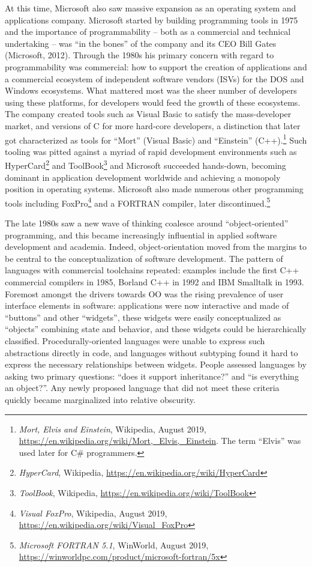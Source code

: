 \documentclass[acmsmall,review]{acmart}\settopmatter{printfolios=true,printccs=false,printacmref=false}
\begin{document}
At this time, Microsoft also saw massive expansion as an operating system and applications company.  Microsoft started by building programming tools in 1975 and the importance of programmability – both as a commercial and technical undertaking – was “in the bones” of the company and its CEO Bill Gates (Microsoft, 2012).  Through the 1980s his primary concern with regard to programmability was commercial: how to support the creation of applications and a commercial ecosystem of independent software vendors (ISVs) for the DOS and Windows ecosystems.  What mattered most was the sheer number of developers using these platforms, for developers would feed the growth of these ecosystems.  The company created tools such as Visual Basic to satisfy the mass-developer market, and versions of C for more hard-core developers, a distinction that later got characterized as tools for “Mort” (Visual Basic) and “Einstein” (C++).\footnote{ \textit{Mort, Elvis and Einstein}, Wikipedia, August 2019, \url{https://en.wikipedia.org/wiki/Mort,_Elvis,_Einstein}.  The term “Elvis” was used later for C\# programmers.}  Such tooling was pitted against a myriad of rapid development environments such as HyperCard\footnote{\textit{HyperCard}, Wikipedia, \url{https://en.wikipedia.org/wiki/HyperCard}}  and ToolBook\footnote{\textit{ToolBook}, Wikipedia, \url{https://en.wikipedia.org/wiki/ToolBook}} and Microsoft succeeded hands-down, becoming dominant in application development worldwide and achieving a monopoly position in operating systems.  Microsoft also made numerous other programming tools including FoxPro\footnote{ \textit{Visual FoxPro}, Wikipedia, August 2019, \url{https://en.wikipedia.org/wiki/Visual_FoxPro}} and a FORTRAN compiler, later discontinued.\footnote{ \textit{Microsoft FORTRAN 5.1}, WinWorld, August 2019, \url{https://winworldpc.com/product/microsoft-fortran/5x}}

The late 1980s saw a new wave of thinking coalesce around “object-oriented” programming, and this became increasingly influential in applied software development and academia.  Indeed, object-orientation moved from the margins to be central to the conceptualization of software development.  The pattern of languages with commercial toolchains repeated: examples include the first C++ commercial compilers in 1985, Borland C++ in 1992 and IBM Smalltalk in 1993.   Foremost amongst the drivers towards OO was the rising prevalence of user interface elements in software: applications were now interactive and made of “buttons” and other “widgets”, these widgets were easily conceptualized as “objects” combining state and behavior, and these widgets could be hierarchically classified. Procedurally-oriented languages were unable to express such abstractions directly in code, and languages without subtyping found it hard to express the necessary relationships between widgets. People assessed languages by asking two primary questions: “does it support inheritance?” and “is everything an object?”.  Any newly proposed language that did not meet these criteria quickly became marginalized into relative obscurity. 
\end{document}
